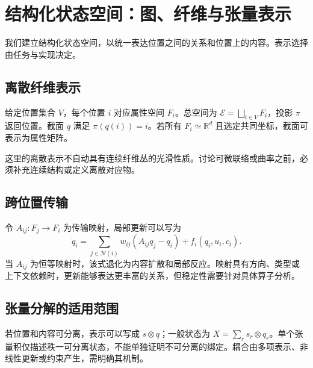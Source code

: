 \chapter{结构化状态空间：图、纤维与张量表示}
\label{chp:universe_geometry}
\label{sec:topology_anatomy}
\label{sec:object_section}
\label{sec:meaning_dynamics}

我们建立结构化状态空间，以统一表达位置之间的关系和位置上的内容。表示选择由任务与实现决定。
\section{离散纤维表示}
给定位置集合 $V$，每个位置 $i$ 对应属性空间 $F_i$。总空间为 $\mathcal{E}=\bigsqcup_{i\in V}F_i$，投影 $\pi$ 返回位置。截面 $q$ 满足 $\pi(q(i))=i$。若所有 $F_i\simeq\mathbb{R}^d$ 且选定共同坐标，截面可表示为属性矩阵。

这里的离散表示不自动具有连续纤维丛的光滑性质。讨论可微联络或曲率之前，必须补充连续结构或定义离散对应物。
\section{跨位置传输}
令 $A_{ij}:F_j\to F_i$ 为传输映射，局部更新可以写为
\begin{equation}\dot q_i=\sum_{j\in\mathcal{N}(i)}w_{ij}(A_{ij}q_j-q_i)+f_i(q_i,u_i,c_i).\end{equation}
当 $A_{ij}$ 为恒等映射时，该式退化为内容扩散和局部反应。映射具有方向、类型或上下文依赖时，更新能够表达更丰富的关系，但稳定性需要针对具体算子分析。
\section{张量分解的适用范围}
若位置和内容可分离，表示可以写成 $s\otimes q$；一般状态为 $X=\sum_r s_r\otimes q_r$。单个张量积仅描述秩一可分离状态，不能单独证明不可分离的绑定。耦合由多项表示、非线性更新或约束产生，需明确其机制。
